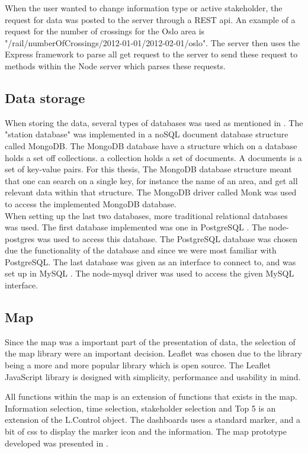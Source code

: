 When the user wanted to change information type or active stakeholder, the
request for data was posted to the server through a REST\cite{REST} api. An
example of a request for the number of crossings for the Oslo area is
"/rail/numberOfCrossings/2012-01-01/2012-02-01/oslo". The server then uses the
Express\cite{express} framework to parse all get request to the server to send
these request to methods within the Node server which parses these requests.



\subsection{Data storage} %
\label{sub:technology_data_storage}
When storing the data, several types of databases was used as mentioned in
. The "station database" was implemented in
a noSQL document database structure called MongoDB\cite{mongoDB}. The MongoDB
database have a structure which on a database holds a set off collections. a
collection holds a set of documents. A documents is a set of key-value pairs.
For this thesis, The MongoDB database structure meant that one can search 
on a single key, for instance the name of an area, and get all relevant data 
within that structure. The MongoDB driver called Monk\cite{npmMonk} was used 
to access the implemented MongoDB database.\\

When setting up the last two databases, more traditional relational databases 
was used. The first database implemented was one in PostgreSQL
\cite{postgreSQLAbout}. The node-postgres\cite{node-postgres} was used to 
access this database. The PostgreSQL database was chosen due the functionality 
of the database and since we were most familiar with PostgreSQL. The 
last database was given as an interface to connect to, and was set up in MySQL
\cite{mySQLAbout}. The node-mysql\cite{node-mysql} driver was used to access 
the given MySQL interface.

\subsection{Map} %
\label{sub:map}
Since the map was a important part of the presentation of data, the selection
of the map library were an important decision. Leaflet\cite{leaflet} was 
chosen due to the library being a more and more popular library which is open 
source. The Leaflet JavaScript library is designed with simplicity, 
performance and usability in mind.

All functions within the map is an extension of functions that exists in the
map. Information selection, time selection, stakeholder selection and Top 5 is
an extension of the L.Control object. The dashboards uses a standard marker,
and a bit of css to display the marker icon and the information. The map
prototype developed was presented in .


